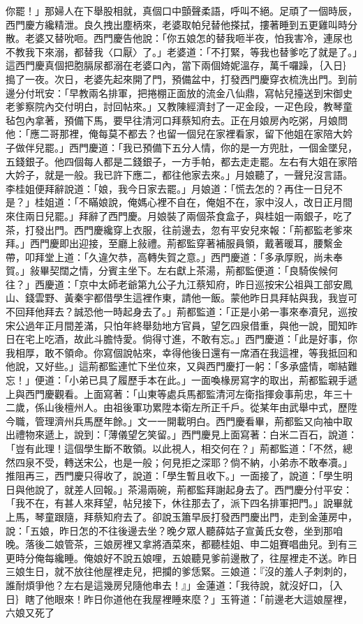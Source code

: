 \begin{showcontents}{}
你罷！」那婦人在下舉股相就，真個口中顫聲柔語，呼叫不絕。足頑了一個時辰，西門慶方纔精泄。良久拽出塵柄來，老婆取帕兒替他搽拭，摟著睡到五更雞叫時分散。老婆又替吮咂。西門慶告他說：「你五娘怎的替我咂半夜，怕我害冷，連尿也不教我下來溺，都替我〈口厭〉了。」老婆道：「不打緊，等我也替爹吃了就是了。」這西門慶真個把胞膈尿都溺在老婆口內，當下兩個婍妮溫存，萬千囉躁，｛入日｝搗了一夜。次日，老婆先起來開了門，預備盆中，打發西門慶穿衣梳洗出門。到前邊分付玳安：「早教兩名排軍，把捲棚正面放的流金八仙鼎，寫帖兒擡送到宋御史老爹察院內交付明白，討回帖來。」又教陳經濟封了一疋金段，一疋色段，教琴童毡包內拿著，預備下馬，要早往清河口拜蔡知府去。正在月娘房內吃粥，月娘問他：「應二哥那裡，俺每莫不都去？也留一個兒在家裡看家，留下他姐在家陪大妗子做伴兒罷。」西門慶道：「我已預備下五分人情，你的是一方兜肚，一個金墜兒，五錢銀子。他四個每人都是二錢銀子，一方手帕，都去走走罷。左右有大姐在家陪大妗子，就是一般。我已許下應二，都往他家去來。」月娘聽了，一聲兒沒言語。李桂姐便拜辭說道：「娘，我今日家去罷。」月娘道：「慌去怎的？再住一日兒不是？」桂姐道：「不瞞娘說，俺媽心裡不自在，俺姐不在，家中沒人，改日正月間來住兩日兒罷。」拜辭了西門慶。月娘裝了兩個茶食盒子，與桂姐一兩銀子，吃了茶，打發出門。西門慶纔穿上衣服，往前邊去，忽有平安兒來報：「荊都監老爹來拜。」西門慶即出迎接，至廳上敍禮。荊都監穿著補服員領，戴著暖耳，腰繫金帶，叩拜堂上道：「久違欠恭，高轉失賀之意。」西門慶道：「多承厚貺，尚未奉賀。」敍畢契闊之情，分賓主坐下。左右獻上茶湯，荊都監便道：「良騎俟候何往？」西慶道：「京中太師老爺第九公子九江蔡知府，昨日巡按宋公祖與工部安鳳山、錢雲野、黃秦宇都借學生這裡作東，請他一飯。蒙他昨日具拜帖與我，我豈可不回拜他拜去？誠恐他一時起身去了。」荊都監道：「正是小弟一事來奉凟兒，巡按宋公過年正月間差滿，只怕年終舉劾地方官員，望乞四泉借重，與他一說，聞知昨日在宅上吃酒，故此斗膽恃愛。倘得寸進，不敢有忘。」西門慶道：「此是好事，你我相厚，敢不領命。你寫個說帖來，幸得他後日還有一席酒在我這裡，等我抵回和他說，又好些。」這荊都監連忙下坐位來，又與西門慶打一躬：「多承盛情，啣結難忘！」便道：「小弟已具了履歷手本在此。」一面喚椽房寫字的取出，荊都監親手遞上與西門慶觀看。上面寫著：「山東等處兵馬都監清河左衛指揮僉事荊忠，年三十二歲，係山後檀州人。由祖後軍功累陞本衛左所正千戶。從某年由武舉中式，歷陞今職，管理濟州兵馬歷年餘。」文一一開載明白。西門慶看畢，荊都監又向袖中取出禮物來遞上，說到：「薄儀望乞笑留。」西門慶見上面寫著：白米二百石，說道：「豈有此理！這個學生斷不敢領。以此視人，相交何在？」荊都監道：「不然，總然四泉不受，轉送宋公，也是一般；何見拒之深耶？倘不納，小弟赤不敢奉凟。」推阻再三，西門慶只得收了，說道：「學生暫且收下。」一面接了，說道：「學生明日與他說了，就差人回報。」茶湯兩碗，荊都監拜謝起身去了。西門慶分付平安：「我不在，有甚人來拜望，帖兒接下，休往那去了，派下四名排軍把門。」說畢就上馬，琴童跟隨，拜蔡知府去了。卻說玉簫早辰打發西門慶出門，走到金蓮房中，說：「五娘，昨日怎的不往後邊去坐？晚夕眾人聽薛姑子宣黃氏女卷，坐到那咱晚。落後二娘管茶，三娘房裡又拿將酒菜來，都聽桂姐、申二姐賽唱曲兒。到有三更時分俺每纔睡。俺娘好不說五娘哩，五娘聽見爹前邊散了，往屋裡走不送。昨日三娘生日，就不放往他屋裡走兒，把攔的爹恁緊。三娘道：『沒的羞人子刺刺的，誰耐煩爭他？左右是這幾房兒隨他串去！』」金蓮道：「我待說，就沒好口，｛入日｝瞎了他眼來！昨日你道他在我屋裡睡來麼？」玉筲道：「前邊老大這娘屋裡，六娘又死了
\end{showcontents}

